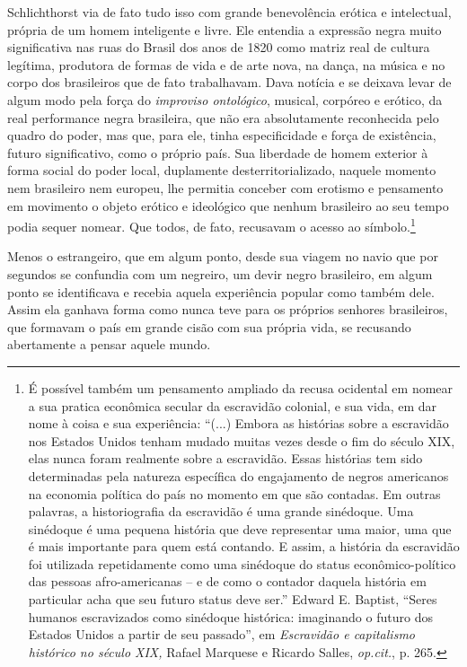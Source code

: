 Schlichthorst via de fato tudo isso com grande benevolência erótica e
intelectual, própria de um homem inteligente e livre. Ele entendia a
expressão negra muito significativa nas ruas do Brasil dos anos de 1820
como matriz real de cultura legítima, produtora de formas de vida e de
arte nova, na dança, na música e no corpo dos brasileiros que de fato
trabalhavam. Dava notícia e se deixava levar de algum modo pela força do
\emph{improviso ontológico}, musical, corpóreo e erótico, da real
performance negra brasileira, que não era absolutamente reconhecida pelo
quadro do poder, mas que, para ele, tinha especificidade e força de
existência, futuro significativo, como o próprio país. Sua liberdade de
homem exterior à forma social do poder local, duplamente
desterritorializado, naquele momento nem brasileiro nem europeu, lhe
permitia conceber com erotismo e pensamento em movimento o objeto
erótico e ideológico que nenhum brasileiro ao seu tempo podia sequer
nomear. Que todos, de fato, recusavam o acesso ao símbolo.\footnote{É
  possível também um pensamento ampliado da recusa ocidental em nomear a
  sua pratica econômica secular da escravidão colonial, e sua vida, em
  dar nome à coisa e sua experiência: ``(...) Embora as histórias sobre
  a escravidão nos Estados Unidos tenham mudado muitas vezes desde o fim
  do século XIX, elas nunca foram realmente sobre a escravidão. Essas
  histórias tem sido determinadas pela natureza específica do
  engajamento de negros americanos na economia política do país no
  momento em que são contadas. Em outras palavras, a historiografia da
  escravidão é uma grande sinédoque. Uma sinédoque é uma pequena
  história que deve representar uma maior, uma que é mais importante
  para quem está contando. E assim, a história da escravidão foi
  utilizada repetidamente como uma sinédoque do status
  econômico-político das pessoas afro-americanas -- e de como o contador
  daquela história em particular acha que seu futuro status deve ser.''
  Edward E. Baptist, ``Seres humanos escravizados como sinédoque
  histórica: imaginando o futuro dos Estados Unidos a partir de seu
  passado'', em \emph{Escravidão e capitalismo histórico no século XIX,}
  Rafael Marquese e Ricardo Salles, \emph{op.cit.}, p. 265.}

Menos o estrangeiro, que em algum ponto, desde sua viagem no navio que
por segundos se confundia com um negreiro, um devir negro brasileiro, em
algum ponto se identificava e recebia aquela experiência popular como
também dele. Assim ela ganhava forma como nunca teve para os próprios
senhores brasileiros, que formavam o país em grande cisão com sua
própria vida, se recusando abertamente a pensar aquele mundo.

